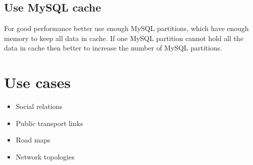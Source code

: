\subsection{Use MySQL cache}

For good performance better use enough MySQL partitions, which have enough memory to keep all data in cache. If one MySQL partition cannot hold all the data in cache then better to increase the number of MySQL partitions.

\section{Use cases}

\begin{itemize}
  \item Social relations
  \item Public transport links
  \item Road maps
  \item Network topologies
\end{itemize}